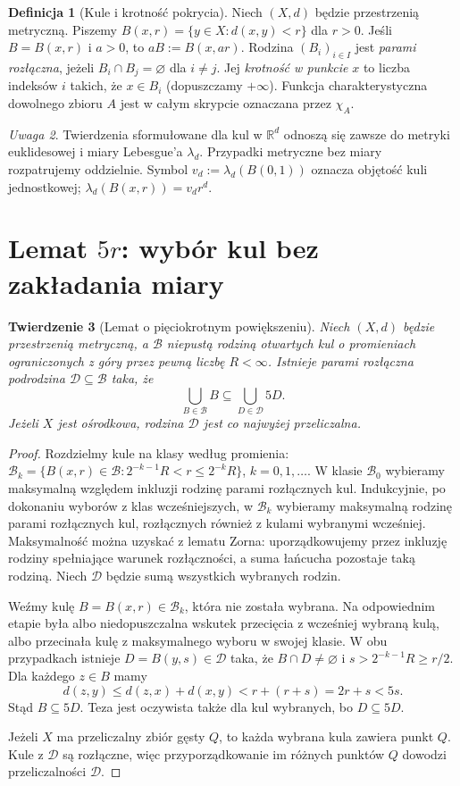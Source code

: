 \documentclass[11pt,a4paper,oneside]{book}
\numberwithin{equation}{chapter}
\theoremstyle{plain}
\newtheorem{twierdzenie}{Twierdzenie}[chapter]
\theoremstyle{definition}
\newtheorem{definicja}[twierdzenie]{Definicja}
\theoremstyle{remark}
\newtheorem{uwaga}[twierdzenie]{Uwaga}
\begin{document}
\begin{definicja}[Kule i krotność pokrycia]
\label{def:balls-24}
Niech $(X,d)$ będzie przestrzenią metryczną. Piszemy
$B(x,r)=\{y\in X:d(x,y)<r\}$ dla $r>0$.
Jeśli $B=B(x,r)$ i $a>0$, to $aB:=B(x,ar)$.
Rodzina $(B_i)_{i\in I}$ jest \emph{parami rozłączna}, jeżeli
$B_i\cap B_j=\varnothing$ dla $i\ne j$.
Jej \emph{krotność w punkcie} $x$ to liczba indeksów $i$ takich,
że $x\in B_i$ (dopuszczamy $+\infty$).
Funkcja charakterystyczna dowolnego zbioru $A$ jest w całym
skrypcie oznaczana przez $\chi_A$.
\end{definicja}

\begin{uwaga}
Twierdzenia sformułowane dla kul w $\mathbb R^d$ odnoszą się
zawsze do metryki euklidesowej i miary Lebesgue'a $\lambda_d$.
Przypadki metryczne bez miary rozpatrujemy oddzielnie.
Symbol $v_d:=\lambda_d(B(0,1))$ oznacza objętość kuli jednostkowej;
$\lambda_d(B(x,r))=v_dr^d$.
\end{uwaga}

\section{Lemat $5r$: wybór kul bez zakładania miary}
\begin{twierdzenie}[Lemat o pięciokrotnym powiększeniu]
\label{thm:5r-24}
Niech $(X,d)$ będzie przestrzenią metryczną, a $\mathcal B$
niepustą rodziną otwartych kul o promieniach ograniczonych
z góry przez pewną liczbę $R<\infty$.
Istnieje parami rozłączna podrodzina $\mathcal D\subseteq\mathcal B$
taka, że
\[
 \bigcup_{B\in\mathcal B}B\subseteq\bigcup_{D\in\mathcal D}5D.
\]
Jeżeli $X$ jest ośrodkowa, rodzina $\mathcal D$ jest co najwyżej
przeliczalna.
\end{twierdzenie}
\begin{proof}
Rozdzielmy kule na klasy według promienia:
$\mathcal B_k=\{B(x,r)\in\mathcal B:
2^{-k-1}R<r\le2^{-k}R\}$, $k=0,1,\ldots$.
W klasie $\mathcal B_0$ wybieramy maksymalną względem inkluzji
rodzinę parami rozłącznych kul. Indukcyjnie, po dokonaniu wyborów
z klas wcześniejszych, w $\mathcal B_k$ wybieramy maksymalną
rodzinę parami rozłącznych kul, rozłącznych również z kulami
wybranymi wcześniej. Maksymalność można uzyskać z lematu
Zorna: uporządkowujemy przez inkluzję rodziny spełniające
warunek rozłączności, a suma łańcucha pozostaje taką rodziną.
Niech $\mathcal D$ będzie sumą wszystkich wybranych rodzin.

Weźmy kulę $B=B(x,r)\in\mathcal B_k$, która nie została
wybrana. Na odpowiednim etapie była albo niedopuszczalna
wskutek przecięcia z wcześniej wybraną kulą, albo przecinała
kulę z maksymalnego wyboru w swojej klasie. W obu przypadkach
istnieje $D=B(y,s)\in\mathcal D$ taka, że $B\cap D\ne\varnothing$
i $s>2^{-k-1}R\ge r/2$. Dla każdego $z\in B$ mamy
\[
 d(z,y)\le d(z,x)+d(x,y)<r+(r+s)=2r+s<5s.
\]
Stąd $B\subseteq5D$. Teza jest oczywista także dla kul
wybranych, bo $D\subseteq5D$.

Jeżeli $X$ ma przeliczalny zbiór gęsty $Q$, to każda wybrana
kula zawiera punkt $Q$. Kule z $\mathcal D$ są rozłączne,
więc przyporządkowanie im różnych punktów $Q$ dowodzi
przeliczalności $\mathcal D$.
\end{proof}
\end{document}
